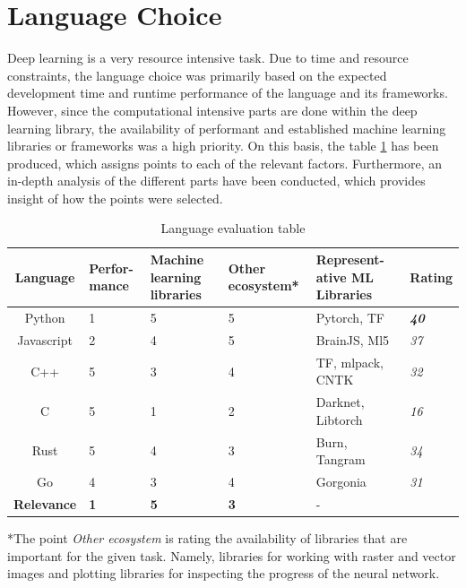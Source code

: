 \documentclass[12pt, a4paper, titlepage]{report}
\begin{document}
\section{Language Choice}  %

Deep learning is a very resource intensive task. Due to time and resource constraints, the language choice was primarily based on the expected development time and runtime performance of the language and its frameworks. However, since the computational intensive parts are done within the deep learning library, the availability of performant and established machine learning libraries or frameworks was a high priority. On this basis, the table \ref{table:language_evaluation} has been produced, which assigns points to each of the relevant factors. Furthermore, an in-depth analysis of the different parts have been conducted, which provides insight of how the points were selected.

\begin{table}[h]
   \begin{tabular} {|c||p{2.0cm}|p{2.5cm}|p{2.5cm}|p{3.0cm}||p{1.5cm}|}
      \hline
      \textbf{Language}    & \textbf{Perfor-mance} & \textbf{Machine learning libraries} & \textbf{Other ecosystem*} & \textbf{Represent-ative ML Libraries} & \textbf{Rating} \\
      \hline
      Python      & 1 & 5 & 5 & Pytorch, TF        & \textbf{\emph{40}} \\ \hline
      Javascript  & 2 & 4 & 5 & BrainJS, Ml5       & \emph{37} \\ \hline
      C++         & 5 & 3 & 4 & TF, mlpack, CNTK   & \emph{32} \\ \hline
      C           & 5 & 1 & 2 & Darknet, Libtorch  & \emph{16} \\ \hline
      Rust        & 5 & 4 & 3 & Burn, Tangram      & \emph{34} \\ \hline
      Go          & 4 & 3 & 4 & Gorgonia           & \emph{31} \\
      \hline\hline
      \textbf{Relevance} & \textbf{1} & \textbf{5} & \textbf{3} & - & \\
      \hline
   \end{tabular}
   \caption{Language evaluation table\\}
   *The point \emph{Other ecosystem} is rating the availability of libraries that are important for the given task. Namely, libraries for working with raster and vector images and plotting libraries for inspecting the progress of the neural network.

   \label{table:language_evaluation}
\end{table}
\end{document}
